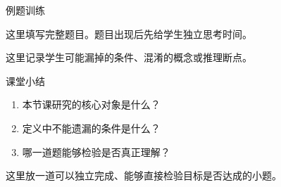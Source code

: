 \documentclass[UTF8,aspectratio=169,11pt]{ctexbeamer}
\begin{document}
\begin{frame}{例题训练}
  \begin{examplebox}[例1]
    这里填写完整题目。题目出现后先给学生独立思考时间。
  \end{examplebox}

  \pause

  \begin{notebox}[易错点]
    这里记录学生可能漏掉的条件、混淆的概念或推理断点。
  \end{notebox}
\end{frame}

\begin{frame}{课堂小结}
  \begin{enumerate}
    \item 本节课研究的核心对象是什么？
    \item 定义中不能遗漏的条件是什么？
    \item 哪一道题能够检验是否真正理解？
  \end{enumerate}

  \vspace{0.25cm}
  \begin{questionbox}[离堂检测]
    这里放一道可以独立完成、能够直接检验目标是否达成的小题。
  \end{questionbox}
\end{frame}

\CampusEndPage
\end{document}
